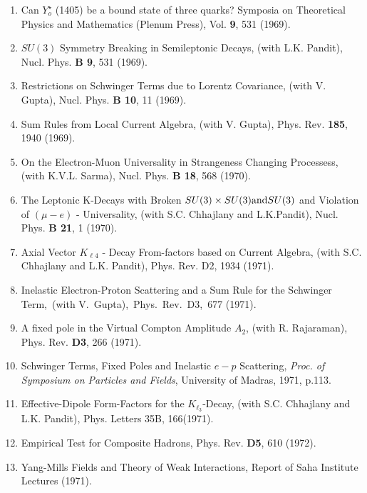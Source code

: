 \begin{enumerate}
\item Can $Y^\star_o$ (1405) be a bound state of three quarks? Symposia
on Theoretical Physics and Mathematics (Plenum Press), Vol. {\bf 9}, 531
(1969).

\item $SU(3)$ Symmetry Breaking in Semileptonic Decays, (with L.K.
Pandit), Nucl. Phys. {\bf B 9}, 531 (1969).

\item Restrictions on Schwinger Terms due to Lorentz Covariance, (with
V. Gupta), Nucl. Phys. {\bf B 10}, 11 (1969).

\item Sum Rules from Local Current Algebra, (with V. Gupta), Phys. Rev.
{\bf 185}, 1940 (1969).

\item On the Electron-Muon Universality in Strangeness Cha\-nging
Processess, (with K.V.L. Sarma), Nucl. Phys. {\bf B 18}, 568 (1970).

\item The Leptonic K-Decays with Broken $SU(3) \times SU(3) \mbox{and} S\-U(3)$ and Violation of $(\mu - e)$ - Universality, (with S.C. Chhajlany and L.K.Pandit), Nucl. Phys. {\bf B 21}, 1 (1970).

\item Axial Vector $K_{\ell 4}$ - Decay From-factors based on Current
Algebra, (with S.C. Chhajlany and L.K. Pandit), Phys. Rev. D2, 1934
(1971).

\item Inelastic Electron-Proton Scattering and a Sum Rule for the
Schwinger Term,\ (with V.\ Gupta),\ Phys.\ Rev.\ D3,\ 677 (1971).

\item A fixed pole in the Virtual Compton Amplitude $A_2$, (with R.
Rajaraman), Phys. Rev. {\bf D3}, 266 (1971).

\item Schwinger Terms, Fixed Poles and Inelastic $e-p$ Scatte\-ring, {\it Proc.
of Symposium on Particles and Fields}, University of Madras, 1971, p.113.

\item Effective-Dipole Form-Factors for the $K_{\ell_3}$-Decay, (with
S.C. Chhajlany and L.K. Pandit), Phys. Letters 35B, 166(1971).

\item Empirical Test for Composite Hadrons, Phys. Rev. {\bf D5}, 610
(1972).

\item Yang-Mills Fields and Theory of Weak Interactions, Report of Saha
Institute Lectures (1971).


\end{enumerate}
